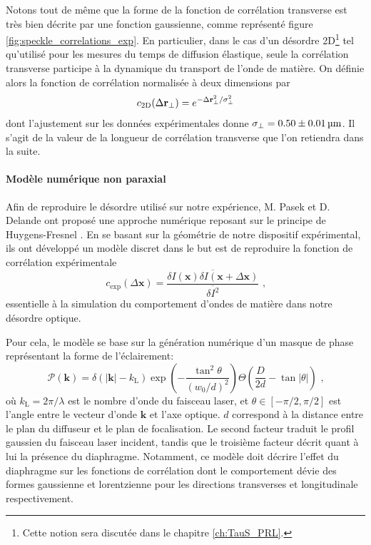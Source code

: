 Notons tout de même que la forme de la fonction de corrélation transverse est très bien décrite par une fonction gaussienne, comme représenté figure \ref{fig:speckle_correlations_exp}. En particulier, dans le cas d'un désordre 2D\footnote{Cette notion sera discutée dans le chapitre \ref{ch:TauS_PRL}.} tel qu'utilisé pour les mesures du temps de diffusion élastique, seule la corrélation transverse participe à la dynamique du transport de l'onde de matière. On définie alors la fonction de corrélation normalisée à deux dimensions par
\begin{equation}
c_{\mathrm{2D}}(\Delta \mathbf{r}_\perp)=e^{-\Delta \mathbf{r}^2_\perp / \sigma_{\perp}^2}
\end{equation}
dont l'ajustement sur les données expérimentales donne $\sigma_{\perp}=0.50\pm\SI{0.01}{\micro\metre}$. Il s'agit de la valeur de la longueur de corrélation transverse que l'on retiendra dans la suite.



\paragraph*{Modèle numérique non paraxial}
Afin de reproduire le désordre utilisé sur notre expérience, M. Pasek et D. Delande ont proposé une approche numérique reposant sur le principe de Huygens-Fresnel \citep{volchkov2018measurement}. En se basant sur la géométrie de notre dispositif expérimental, ils ont développé un modèle discret dans le but est de reproduire la fonction de corrélation expérimentale
\begin{equation}
c_{\mathrm{exp}}(\Delta \mathbf{x})=\frac{\overline{\delta I(\mathbf{x}) \delta I(\mathbf{x} + \Delta \mathbf{x})}}{\overline{\delta I^2}} \text{ ,}
\label{eq:correlation_3D_normalisee}
\end{equation}
essentielle à la simulation du comportement d'ondes de matière dans notre désordre optique.

Pour cela, le modèle se base sur la génération numérique d'un masque de phase représentant la forme de l'éclairement:
\begin{equation}
\mathcal{P}(\mathbf{k})=\delta(\left| \mathbf{k} \right| - k_{\mathrm{L}}) \exp{\left( - \frac{\tan^2 \theta}{(w_0/d)^2} \right)} \Theta \left( \frac{D}{2d}-\tan{\left| \theta \right|} \right) \text{ ,}
\label{eq:speckle_masque_phase}
\end{equation}
où $k_{\mathrm{L}}=2\pi/\lambda$ est le nombre d'onde du faisceau laser, et $\theta\in\left[ -\pi/2, \pi/2 \right]$ est l'angle entre le vecteur d'onde $\mathbf{k}$ et l'axe optique. $d$ correspond à la distance entre le plan du diffuseur et le plan de focalisation. Le second facteur traduit le profil gaussien du faisceau laser incident, tandis que le troisième facteur décrit quant à lui la présence du diaphragme. Notamment, ce modèle doit décrire l'effet du diaphragme sur les fonctions de corrélation dont le comportement dévie des formes gaussienne et lorentzienne pour les directions transverses et longitudinale respectivement. 

